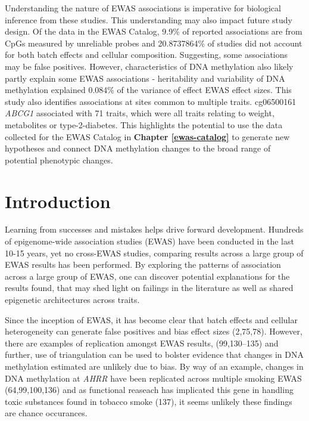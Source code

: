 \documentclass[11pt,oneside]{bristolthesis}
\begin{document}
Understanding the nature of EWAS associations is imperative for biological inference from these studies. This understanding may also impact future study design. Of the data in the EWAS Catalog, 9.9\% of reported associations are from CpGs measured by unreliable probes and 20.8737864\% of studies did not account for both batch effects and cellular composition. Suggesting, some associations may be false positives. However, characteristics of DNA methylation also likely partly explain some EWAS associations - heritability and variability of DNA methylation explained 0.084\% of the variance of effect EWAS effect sizes. This study also identifies associations at sites common to multiple traits. cg06500161 \emph{ABCG1} associated with 71 traits, which were all traits relating to weight, metabolites or type-2-diabetes. This highlights the potential to use the data collected for the EWAS Catalog in \textbf{Chapter \ref{ewas-catalog}} to generate new hypotheses and connect DNA methylation changes to the broad range of potential phenotypic changes.

\hypertarget{introduction-04}{%
\section{Introduction}\label{introduction-04}}

Learning from successes and mistakes helps drive forward development. Hundreds of epigenome-wide association studies (EWAS) have been conducted in the last 10-15 years, yet no cross-EWAS studies, comparing results across a large group of EWAS results has been performed. By exploring the patterns of association across a large group of EWAS, one can discover potential explanations for the results found, that may shed light on failings in the literature as well as shared epigenetic architectures across traits.

Since the inception of EWAS, it has become clear that batch effects and cellular heterogeneity can generate false positives and bias effect sizes (2,75,78). However, there are examples of replication amongst EWAS results, (99,130--135) and further, use of triangulation can be used to bolster evidence that changes in DNA methylation estimated are unlikely due to bias. By way of an example, changes in DNA methylation at \emph{AHRR} have been replicated across multiple smoking EWAS (64,99,100,136) and as functional reaseach has implicated this gene in handling toxic substances found in tobacco smoke (137), it seems unlikely these findings are chance occurances.
\end{document}
